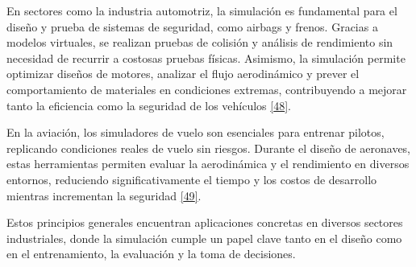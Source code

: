 \documentclass[12pt,oneside]{templates/unerthesis}
\begin{document}
En sectores como la industria automotriz, la simulación es fundamental para el diseño y prueba de sistemas de seguridad, como airbags y frenos. Gracias a modelos virtuales, se realizan pruebas de colisión y análisis de rendimiento sin necesidad de recurrir a costosas pruebas físicas. Asimismo, la simulación permite optimizar diseños de motores, analizar el flujo aerodinámico y prever el comportamiento de materiales en condiciones extremas, contribuyendo a mejorar tanto la eficiencia como la seguridad de los vehículos \protect\hyperlink{ref-stork_towards_2008}{{[}48{]}}.

En la aviación, los simuladores de vuelo son esenciales para entrenar pilotos, replicando condiciones reales de vuelo sin riesgos. Durante el diseño de aeronaves, estas herramientas permiten evaluar la aerodinámica y el rendimiento en diversos entornos, reduciendo significativamente el tiempo y los costos de desarrollo mientras incrementan la seguridad \protect\hyperlink{ref-jentsch_simulation_2017}{{[}49{]}}.

Estos principios generales encuentran aplicaciones concretas en diversos sectores industriales, donde la simulación cumple un papel clave tanto en el diseño como en el entrenamiento, la evaluación y la toma de decisiones.

\begin{table}[!h]
\centering
\caption{\label{tab:unnamed-chunk-2}Aplicaciones de la simulación en distintos sectores}
\centering
{}
\end{table}
\end{document}
